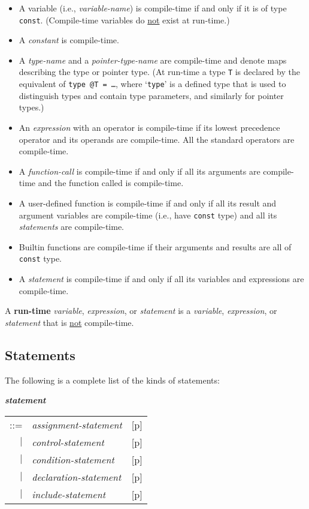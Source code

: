 \documentclass[12pt]{article}
\newcommand{\key}[1]{{\rm \bfseries #1}}
\newcommand{\emkey}[1]{{\em \bfseries #1}}
\newcommand{\pagref}[1]{p\pageref{#1}}
\newenvironment{indpar}[1][0.3in]%
	{\begin{list}{}%
		     {\setlength{\itemsep}{0in}%
		      \setlength{\topsep}{0in}%
		      \setlength{\parsep}{1ex}%
		      \setlength{\labelwidth}{#1}%
		      \setlength{\leftmargin}{#1}%
		      \addtolength{\leftmargin}{\labelsep}}%
	 \item}%
	{\end{list}}
\begin{document}
\begin{itemize}
\item A variable (i.e., {\em variable-name})
is compile-time if and only if it is of type {\tt const}.
(Compile-time variables do \underline{not} exist at run-time.)
\item A {\em constant} is compile-time.
\item A {\em type-name} and a {\em pointer-type-name} are compile-time
and denote maps describing the type or pointer type.
(At run-time a type {\tt T} is declared by the
equivalent of {\tt type @T = \ldots}, where `{\tt type}' is a
defined type that is
used to distinguish types and contain type parameters, and
similarly for pointer types.)
\item An {\em expression} with an operator is
      compile-time if its lowest precedence operator
      and its operands are compile-time.
      All the standard operators are compile-time.
\item A {\em function-call} is compile-time if and only if all its
      arguments are compile-time and the function called is
      compile-time.
\item A user-defined function is compile-time if and only if all its
      result and argument variables are compile-time (i.e., have
      {\tt const} type) and all its
      {\em statements} are compile-time.
\item Builtin functions are compile-time if their arguments and
      results are all of {\tt const} type.
\item A {\em statement} is compile-time if and only if all its
      variables and expressions are compile-time.
\end{itemize}

A \key{run-time} {\em variable}, {\em expression}, or {\em statement}
is a {\em variable}, {\em expression}, or {\em statement} that is
\underline{not} compile-time.

\subsection{Statements}
\label{STATEMENTS}

The following is a complete list of the kinds of statements:
\begin{indpar}
\emkey{statement}\label{STATEMENT}
    \begin{tabular}[t]{@{}rll}
    ::= & {\em assignment-statement}
        & [\pagref{ASSIGNMENT-STATEMENTS}] \\
    $|$ & {\em control-statement}
        & [\pagref{CONTROL-STATEMENT}] \\
    $|$ & {\em condition-statement}
        & [\pagref{CONDITIONAL-STATEMENTS}] \\
    $|$ & {\em declaration-statement}
        & [\pagref{DECLARATION-STATEMENT}] \\
    $|$ & {\em include-statement}
        & [\pagref{INCLUDE-STATEMENTS}] \\
    \end{tabular}
\end{indpar}
\end{document}

